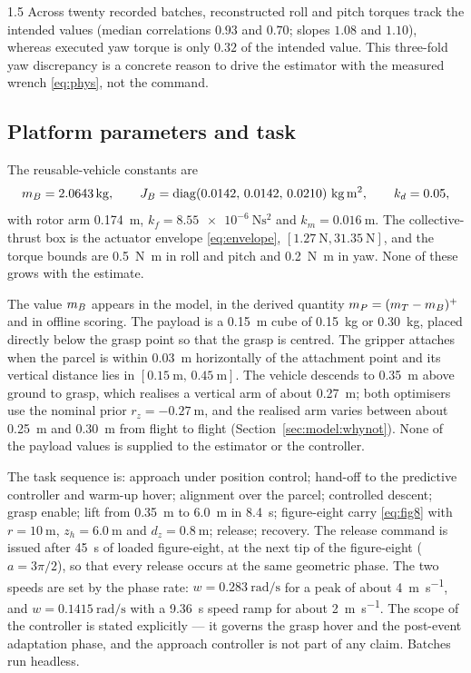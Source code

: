 \begin{spacing}{1.5}
Across twenty recorded batches, reconstructed roll and pitch torques track the
intended values (median correlations $0.93$ and $0.70$; slopes $1.08$ and
$1.10$), whereas executed yaw torque is only $0.32$ of the intended value. This
three-fold yaw discrepancy is a concrete reason to drive the estimator with the
measured wrench \eqref{eq:phys}, not the command.

\subsection{Platform parameters and task}\label{sec:eval:params}

The reusable-vehicle constants are
\begin{equation}
\mB=\SI{2.0643}{\kg},\qquad
\Jb=\mathrm{diag}(0.0142,\,0.0142,\,0.0210)\ \si{\kg\meter\squared},\qquad
k_d=0.05 ,
\label{eq:platform}
\end{equation}
with rotor arm \SI{0.174}{\meter}, $k_f=\SI{8.55e-6}{\newton\second\squared}$ and
$k_m=\SI{0.016}{\meter}$. The collective-thrust box is the actuator envelope
\eqref{eq:envelope}, $[\SI{1.27}{\newton},\SI{31.35}{\newton}]$, and the torque
bounds are \SI{0.5}{\newton\meter} in roll and pitch and
\SI{0.2}{\newton\meter} in yaw. None of these grows with the estimate.

The value $m_B$ appears in the model, in the derived quantity
$m_P=(m_T-m_B)^{+}$ and in offline scoring. The payload is a
\SI{0.15}{\meter} cube of \SI{0.15}{\kg} or \SI{0.30}{\kg}, placed directly
below the grasp point so that the grasp is centred. The gripper attaches when the
parcel is within \SI{0.03}{\meter} horizontally of the attachment point and its
vertical distance lies in $[\SI{0.15}{\meter},\,\SI{0.45}{\meter}]$. The
vehicle descends to \SI{0.35}{\meter} above ground to grasp, which realises a
vertical arm of about \SI{0.27}{\meter}; both optimisers use the nominal prior
$r_z=\SI{-0.27}{\meter}$, and the realised arm varies between about
\SI{0.25}{\meter} and \SI{0.30}{\meter} from flight to flight
(Section~\ref{sec:model:whynot}). None of the payload values is supplied to the
estimator or the controller.

The task sequence is: approach under position control; hand-off to the predictive
controller and warm-up hover; alignment over the parcel; controlled descent;
grasp enable; lift from \SI{0.35}{\meter} to \SI{6.0}{\meter} in
\SI{8.4}{\second}; figure-eight carry \eqref{eq:fig8} with $r=\SI{10}{\meter}$,
$z_h=\SI{6.0}{\meter}$ and $d_z=\SI{0.8}{\meter}$; release; recovery. The
release command is issued after \SI{45}{\second} of loaded figure-eight, at the
next tip of the figure-eight ($a=3\pi/2$), so that every release occurs at the
same geometric phase. The two speeds are set by the phase rate:
$w=\SI{0.283}{\radian\per\second}$ for a peak of about
\SI{4}{\meter\per\second}, and $w=\SI{0.1415}{\radian\per\second}$ with a
\SI{9.36}{\second} speed ramp for about \SI{2}{\meter\per\second}. The scope of
the controller is stated explicitly --- it governs the grasp hover and the
post-event adaptation phase, and the approach controller is not part of any
claim. Batches run headless.


\end{spacing}
